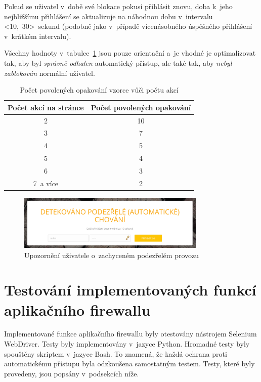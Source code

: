 \noindent
Pokud se uživatel v~době své blokace pokusí přihlásit znovu, doba k~jeho nejbližšímu přihlášení se aktualizuje na náhodnou dobu v~intervalu <10,~30>~sekund   (podobně jako v~případě vícenásobného úspěšného přihlášení v~krátkém intervalu).

Všechny hodnoty v~tabulce~\ref{tab:allowed_num_of_repeatings} jsou pouze orientační a~je vhodné je optimalizovat tak, aby byl \textit{správně odhalen} automatický přístup, ale také tak, aby \textit{nebyl zablokován} normální uživatel.

\begin{table}[ht]
\centering
\label{tab:allowed_num_of_repeatings}
\begin{tabular}{|c|c|}
\hline
\textbf{Počet akcí na stránce} & \textbf{Počet povolených opakování} \\ \hline
2 & 10 \\
3 & 7 \\ 
4 & 5 \\ 
5 & 4 \\ 
6 & 3 \\ 
7~a více & 2 \\ \hline
\end{tabular}
\caption{Počet povolených opakování vzorce vůči počtu akcí}
\end{table}

\begin{figure}[H]
	\centering
	\includegraphics[width=0.8\textwidth]{images/bad_behaviour.jpg}
	\caption{Upozornění uživatele o~zachyceném podezřelém provozu}
	\label{img:bad_behaviour}
\end{figure}

\section{Testování implementovaných funkcí aplikačního firewallu}
Implementované funkce aplikačního firewallu byly otestovány nástrojem Selenium WebDriver. Testy byly implementovány v~jazyce Python. Hromadné testy byly spouštěny skriptem v~jazyce Bash. To znamená, že každá ochrana proti automatickému přístupu byla odzkoušena samostatným testem. Testy, které byly provedeny, jsou popsány v~podsekcích níže.


